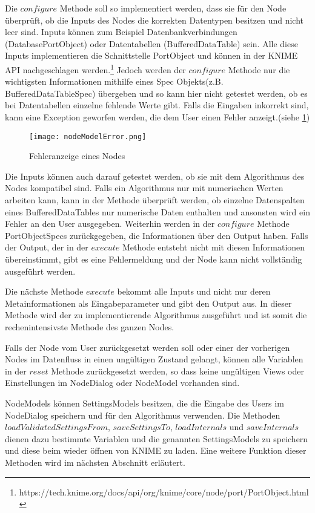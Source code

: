 Die $configure$ Methode soll so implementiert werden, dass sie für den Node überprüft, ob die Inputs des Nodes die korrekten Datentypen besitzen und nicht leer sind. 
Inputs können zum Beispiel Datenbankverbindungen (DatabasePortObject) oder Datentabellen (BufferedDataTable) sein. Alle diese Inputs implementieren die Schnittstelle PortObject und können in der KNIME API nachgeschlagen werden.\footnote{https://tech.knime.org/docs/api/org/knime/core/node/port/PortObject.html}
Jedoch werden der $configure$ Methode nur die wichtigsten Informationen mithilfe eines Spec Objekts(z.B. BufferedDataTableSpec) übergeben und so kann hier nicht getestet werden, ob es bei Datentabellen einzelne fehlende Werte gibt.
Falls die Eingaben inkorrekt sind, kann eine Exception geworfen werden, die dem User einen Fehler anzeigt.(siehe \ref{img:nodeModelError})

\begin{figure}[H]
	\centering
	\texttt{[image: nodeModelError.png]}
	\caption{Fehleranzeige eines Nodes}
	\label{img:nodeModelError}
\end{figure}

Die Inputs können auch darauf getestet werden, ob sie mit dem Algorithmus des Nodes kompatibel sind. Falls ein Algorithmus nur mit numerischen Werten arbeiten kann, kann in der Methode überprüft werden, ob einzelne Datenspalten eines BufferedDataTables nur numerische Daten enthalten und ansonsten wird ein Fehler an den User ausgegeben.
Weiterhin werden in der $configure$ Methode PortObjectSpecs zurückgegeben, die Informationen über den Output haben. Falls der Output, der in der $execute$ Methode entsteht nicht mit diesen Informationen übereinstimmt, gibt es eine Fehlermeldung und der Node kann nicht vollständig ausgeführt werden.

Die nächste Methode $execute$ bekommt alle Inputs und nicht nur deren Metainformationen als Eingabeparameter und gibt den Output aus. In dieser Methode wird der zu implementierende Algorithmus ausgeführt und ist somit die rechenintensivste Methode des ganzen Nodes. 

Falls der Node vom User zurückgesetzt werden soll oder einer der vorherigen Nodes im Datenfluss in einen ungültigen Zustand gelangt, können alle Variablen in der $reset$ Methode zurückgesetzt werden, so dass keine ungültigen Views oder Einstellungen im NodeDialog oder NodeModel vorhanden sind. 

NodeModels können SettingsModels besitzen, die die Eingabe des Users im NodeDialog speichern und für den Algorithmus verwenden. Die Methoden $loadValidatedSettingsFrom$, $saveSettingsTo$, $loadInternals$ und $saveInternals$ dienen dazu bestimmte Variablen und die genannten SettingsModels zu speichern und diese beim wieder öffnen von KNIME zu laden. Eine weitere Funktion dieser Methoden wird im nächsten Abschnitt erläutert.
